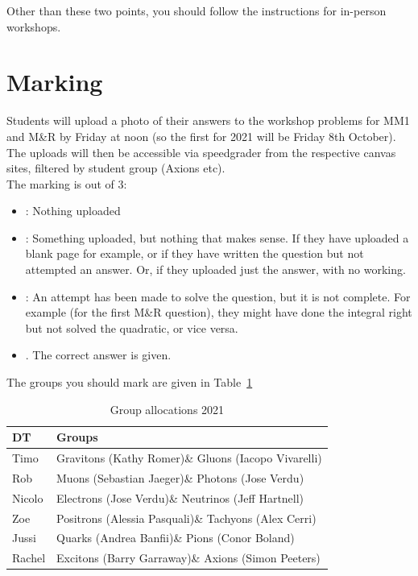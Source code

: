 \documentclass[11.5pt,sans,english]{article}
\begin{document}
Other than these two points, you should follow the instructions for in-person workshops.

\section{Marking}

Students will upload a photo of their answers to the workshop problems for MM1 and M\&R by Friday at noon (so the first for 2021 will be Friday 8th October).\\

The uploads will then be accessible via speedgrader from the respective canvas sites, filtered by student group (Axions etc).\\

The marking is out of 3:\\
\begin{itemize}
\item[0]: Nothing uploaded
\item[1]: Something uploaded, but nothing that makes sense. If they have uploaded a blank page for example, or if they have written the question but not attempted an answer. Or, if they uploaded just the answer, with no working.
\item[2]: An attempt has been made to solve the question, but it is not complete. For example (for the first M\&R question), they might have done the integral right but not solved the quadratic, or vice versa.
\item[3]. The correct answer is given.
\end{itemize}

The groups you should mark are given in Table~\ref{table:marking}\\


\begin{table}[h]
\begin{center}
\begin{tabular}{ll}\toprule
  \textbf{DT} & \textbf{Groups} \\[1ex] \midrule
  Timo & Gravitons (Kathy Romer)\& Gluons (Iacopo Vivarelli) \\[1ex]
  Rob & Muons (Sebastian Jaeger)\& Photons (Jose Verdu) \\[1ex]
  Nicolo & Electrons (Jose Verdu)\& Neutrinos (Jeff Hartnell) \\[1ex]
  Zoe & Positrons (Alessia Pasquali)\& Tachyons (Alex Cerri) \\[1ex]
  Jussi & Quarks (Andrea Banfii)\& Pions (Conor Boland) \\[1ex]
  Rachel & Excitons (Barry Garraway)\& Axions (Simon Peeters) \\ \bottomrule
  \hline 
\end{tabular}
\caption{Group allocations 2021}
\label{table:marking}
\end{center}
\end{table}
\end{document}
